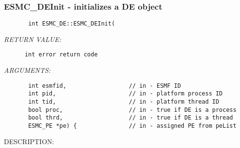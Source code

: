  
\parskip        0pt
\parindent      0pt
\baselineskip  11pt
 
\def\bv{\begin{verbatim}}
\def\ev{\end{verbatim}}
\def\be{\begin{equation}}
\def\ee{\end{equation}}
\def\bea{\begin{eqnarray}}
\def\eea{\end{eqnarray}}
\def\bi{\begin{itemize}}
\def\ei{\end{itemize}}
\def\bn{\begin{enumerate}}
\def\en{\end{enumerate}}
\def\bd{\begin{description}}
\def\ed{\end{description}}
\def\({\left (}
\def\){\right )}
\def\[{\left [}
\def\]{\right ]}
\def\<{\left  \langle}
\def\>{\right \rangle}
\def\cI{{\cal I}}
\def\diag{\mathop{\rm diag}}
\def\tr{\mathop{\rm tr}}


 
\subsubsection{ESMC\_DEInit - initializes a DE object}


  
\begin{verbatim}       int ESMC_DE::ESMC_DEInit(\end{verbatim}{\em RETURN VALUE:}
\begin{verbatim}      int error return code\end{verbatim}{\em ARGUMENTS:}
\begin{verbatim}       int esmfid,                  // in - ESMF ID
       int pid,                     // in - platform process ID
       int tid,                     // in - platform thread ID
       bool proc,                   // in - true if DE is a process
       bool thrd,                   // in - true if DE is a thread
       ESMC_PE *pe) {               // in - assigned PE from peList\end{verbatim}
{\sf DESCRIPTION:\\ }


